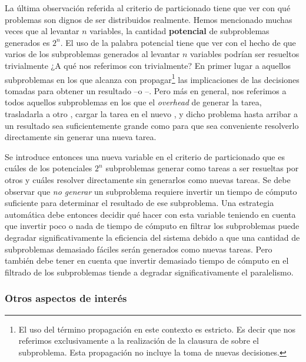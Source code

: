 La última observación referida al criterio de particionado tiene que ver con
qué problemas son dignos de ser distribuidos realmente. Hemos mencionado
muchas veces que al levantar $n$ variables, la cantidad \textbf{potencial} de
subproblemas generados es $2^n$. El uso de la palabra potencial tiene que ver
con el hecho de que varios de los subproblemas generados al levantar $n$
variables podrían ser resueltos trivialmente ¿A qué nos referimos con
trivialmente? En primer lugar a aquellos subproblemas en los que alcanza con
propagar\footnote{El uso del término propagación en este contexto es estricto.
Es decir que nos referimos exclusivamente a la realización de la clausura de
\bcp sobre el subproblema. Esta propagación no incluye la toma de nuevas
decisiones.} las implicaciones de las decisiones tomadas para obtener un
resultado --\sat o \unsat--. Pero más en general, nos referimos a todos
aquellos subproblemas en los que el \emph{overhead} de generar la tarea,
trasladarla a otro \w, cargar la tarea en el nuevo \w, y \solvear dicho
problema hasta arribar a un resultado sea suficientemente grande como para que
sea conveniente resolverlo directamente sin generar
una nueva tarea.

Se introduce entonces una nueva variable en el criterio de particionado que es
cuáles de los potenciales $2^n$ subproblemas generar como tareas a ser
resueltas por otros \ws y cuáles resolver directamente sin generarlos como nuevas
tareas. Se debe observar que \emph{no generar} un subproblema requiere invertir
un tiempo de cómputo suficiente para determinar el resultado de ese
subproblema. Una estrategia automática debe entonces decidir qué hacer con
esta variable teniendo en cuenta que invertir poco o nada de tiempo de cómputo
en filtrar los subproblemas puede degradar significativamente la eficiencia
del sistema debido a que una cantidad de subproblemas
demasiado fáciles serán generados como nuevas tareas. Pero también debe tener en cuenta que invertir demasiado
tiempo de cómputo en el filtrado de los subproblemas tiende a degradar
significativamente el paralelismo.

\subsubsection{Otros aspectos de interés}

